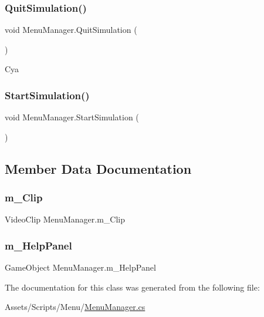\subsubsection{\texorpdfstring{QuitSimulation()}{QuitSimulation()}}
{\footnotesize\ttfamily void Menu\+Manager.\+Quit\+Simulation (\begin{DoxyParamCaption}{ }\end{DoxyParamCaption})}



Cya 

\mbox{\label{class_menu_manager_aad07ac0fe7c5949783f2e8b27f7d3ad1}} 
\subsubsection{\texorpdfstring{StartSimulation()}{StartSimulation()}}
{\footnotesize\ttfamily void Menu\+Manager.\+Start\+Simulation (\begin{DoxyParamCaption}{ }\end{DoxyParamCaption})}







\subsection{Member Data Documentation}
\mbox{\label{class_menu_manager_a387b1b8533d1014c35f9a5b5f0258654}} 
\subsubsection{\texorpdfstring{m\_Clip}{m\_Clip}}
{\footnotesize\ttfamily Video\+Clip Menu\+Manager.\+m\+\_\+\+Clip}

\mbox{\label{class_menu_manager_a6e4cb070ce6d754b560a44bc03f73c0a}} 
\subsubsection{\texorpdfstring{m\_HelpPanel}{m\_HelpPanel}}
{\footnotesize\ttfamily Game\+Object Menu\+Manager.\+m\+\_\+\+Help\+Panel}



The documentation for this class was generated from the following file\+:\begin{DoxyCompactItemize}
\item 
Assets/\+Scripts/\+Menu/\mbox{\hyperlink{_menu_manager_8cs}{Menu\+Manager.\+cs}}\end{DoxyCompactItemize}
